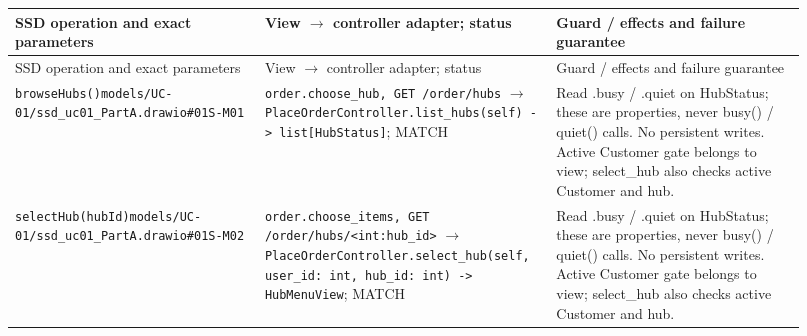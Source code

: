 \begin{longtable}{>{\raggedright\arraybackslash}p{0.3067\linewidth}>{\raggedright\arraybackslash}p{0.3067\linewidth}>{\raggedright\arraybackslash}p{0.3067\linewidth}}
SSD operation and exact parameters & View \ensuremath{\rightarrow} controller adapter; status & Guard / effects and failure guarantee \\
\hline\endfirsthead
SSD operation and exact parameters & View \ensuremath{\rightarrow} controller adapter; status & Guard / effects and failure guarantee \\
\hline\endhead
\texttt{browseHubs()}\newline{}\texttt{models/\allowbreak{}UC-01/\allowbreak{}ssd\_\allowbreak{}uc01\_\allowbreak{}PartA.\allowbreak{}drawio\#01S-M01} & \texttt{order.\allowbreak{}choose\_\allowbreak{}hub, GET /\allowbreak{}order/\allowbreak{}hubs} \ensuremath{\rightarrow} \texttt{PlaceOrderController.\allowbreak{}list\_\allowbreak{}hubs(self) -\textgreater{} list[HubStatus]}; MATCH & Read .busy / .quiet on HubStatus; these are properties, never busy() / quiet() calls. No persistent writes. Active Customer gate belongs to view; select\_hub also checks active Customer and hub. \\
\texttt{selectHub(hubId)}\newline{}\texttt{models/\allowbreak{}UC-01/\allowbreak{}ssd\_\allowbreak{}uc01\_\allowbreak{}PartA.\allowbreak{}drawio\#01S-M02} & \texttt{order.\allowbreak{}choose\_\allowbreak{}items, GET /\allowbreak{}order/\allowbreak{}hubs/\allowbreak{}\textless{}int:hub\_\allowbreak{}id\textgreater{}} \ensuremath{\rightarrow} \texttt{PlaceOrderController.\allowbreak{}select\_\allowbreak{}hub(self, user\_\allowbreak{}id: int, hub\_\allowbreak{}id: int) -\textgreater{} HubMenuView}; MATCH & Read .busy / .quiet on HubStatus; these are properties, never busy() / quiet() calls. No persistent writes. Active Customer gate belongs to view; select\_hub also checks active Customer and hub. \\

\end{longtable}
